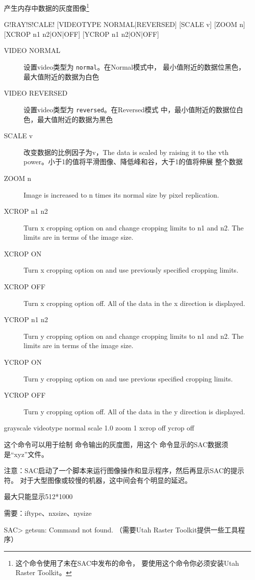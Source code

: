 \label{cmd:grayscale}

产生内存中数据的灰度图像\footnote{这个命令使用了未在SAC中发布的命令，
    要使用这个命令你必须安装Utah Raster Toolkit。}

\begin{SACSTX}
G!RAY!S!CALE! [VIDEOTYPE NORMAL|REVERSED] [SCALE v] [ZOOM n]
    [XCROP n1 n2|ON|OFF] [YCROP n1 n2|ON|OFF]
\end{SACSTX}

\begin{description}
\item [VIDEO NORMAL] 设置video类型为 \texttt{normal}。在Normal模式中，
    最小值附近的数据位黑色，最大值附近的数据为白色
\item [VIDEO REVERSED] 设置video类型为 \texttt{reversed}。在Reversed模式
    中，最小值附近的数据位白色，最大值附近的数据为黑色
\item [SCALE v] 改变数据的比例因子为v，The data is scaled by raising it
    to the vth power。小于1的值将平滑图像、降低峰和谷，大于1的值将伸展
    整个数据
\item [ZOOM n] Image is increased to n times its normal size by pixel replication.
\item [XCROP n1 n2] Turn x cropping option on and change cropping limits
    to n1 and n2. The limits are in terms of the image size.
\item [XCROP ON] Turn x cropping option on and use previously specified cropping limits.
\item [XCROP OFF] Turn x cropping option off.  All of the data in the x direction is displayed.
\item [YCROP n1 n2] Turn y cropping option on and change cropping limits to n1 and n2. The limits are in terms of the image size.
\item [YCROP ON] Turn y cropping option on and use previous specified cropping limits.
\item [YCROP OFF] Turn y cropping option off.  All of the data in the y direction is displayed.
\end{description}

\begin{SACDFT}
grayscale videotype normal scale 1.0 zoom 1 xcrop off ycrop off
\end{SACDFT}

这个命令可以用于绘制  命令输出的灰度图，用这个
命令显示的SAC数据须是``xyz''文件。

注意：SAC启动了一个脚本来运行图像操作和显示程序，然后再显示SAC的提示符。
对于大型图像或较慢的机器，这中间会有个明显的延迟。

最大只能显示512*1000

需要：iftype、nxsize、nysize

SAC> getsun: Command not found.  （需要Utah Raster Toolkit提供一些工具程序）
